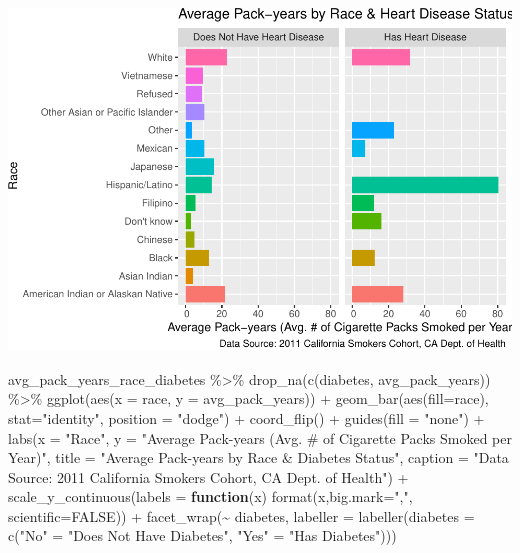 \documentclass[
]{article}
\newenvironment{Shaded}{\begin{snugshade}}{\end{snugshade}}
\newcommand{\AttributeTok}[1]{\textcolor[rgb]{0.77,0.63,0.00}{#1}}
\newcommand{\ConstantTok}[1]{\textcolor[rgb]{0.00,0.00,0.00}{#1}}
\newcommand{\ControlFlowTok}[1]{\textcolor[rgb]{0.13,0.29,0.53}{\textbf{#1}}}
\newcommand{\FunctionTok}[1]{\textcolor[rgb]{0.00,0.00,0.00}{#1}}
\newcommand{\NormalTok}[1]{#1}
\newcommand{\OtherTok}[1]{\textcolor[rgb]{0.56,0.35,0.01}{#1}}
\newcommand{\SpecialCharTok}[1]{\textcolor[rgb]{0.00,0.00,0.00}{#1}}
\newcommand{\StringTok}[1]{\textcolor[rgb]{0.31,0.60,0.02}{#1}}
\begin{document}
\includegraphics{Milestone_4_files/figure-latex/bar graph of cigarette pack-years by race and heartdis-1.pdf}
\newpage

\begin{Shaded}
\begin{Highlighting}[]
\NormalTok{avg\_pack\_years\_race\_diabetes }\SpecialCharTok{\%\textgreater{}\%}
  \FunctionTok{drop\_na}\NormalTok{(}\FunctionTok{c}\NormalTok{(diabetes, avg\_pack\_years)) }\SpecialCharTok{\%\textgreater{}\%}
  \FunctionTok{ggplot}\NormalTok{(}\FunctionTok{aes}\NormalTok{(}\AttributeTok{x =}\NormalTok{ race, }\AttributeTok{y =}\NormalTok{ avg\_pack\_years)) }\SpecialCharTok{+}
  \FunctionTok{geom\_bar}\NormalTok{(}\FunctionTok{aes}\NormalTok{(}\AttributeTok{fill=}\NormalTok{race), }\AttributeTok{stat=}\StringTok{"identity"}\NormalTok{, }\AttributeTok{position =} \StringTok{"dodge"}\NormalTok{) }\SpecialCharTok{+}
  \FunctionTok{coord\_flip}\NormalTok{() }\SpecialCharTok{+}
  \FunctionTok{guides}\NormalTok{(}\AttributeTok{fill =} \StringTok{"none"}\NormalTok{) }\SpecialCharTok{+}
  \FunctionTok{labs}\NormalTok{(}\AttributeTok{x =} \StringTok{"Race"}\NormalTok{,}
       \AttributeTok{y =} \StringTok{"Average Pack{-}years (Avg. \# of Cigarette Packs Smoked per Year)"}\NormalTok{,}
  \AttributeTok{title =} \StringTok{"Average Pack{-}years by Race \& Diabetes Status"}\NormalTok{,}
  \AttributeTok{caption =} \StringTok{"Data Source: 2011 California Smokers Cohort, CA Dept. of Health"}\NormalTok{) }\SpecialCharTok{+}
  \FunctionTok{scale\_y\_continuous}\NormalTok{(}\AttributeTok{labels =} \ControlFlowTok{function}\NormalTok{(x) }\FunctionTok{format}\NormalTok{(x,}\AttributeTok{big.mark=}\StringTok{","}\NormalTok{,}
                                                     \AttributeTok{scientific=}\ConstantTok{FALSE}\NormalTok{)) }\SpecialCharTok{+}
  \FunctionTok{facet\_wrap}\NormalTok{(}\SpecialCharTok{\textasciitilde{}}\NormalTok{ diabetes,}
             \AttributeTok{labeller =} \FunctionTok{labeller}\NormalTok{(}\AttributeTok{diabetes =} \FunctionTok{c}\NormalTok{(}\StringTok{"No"} \OtherTok{=} \StringTok{"Does Not Have Diabetes"}\NormalTok{,}
                                                      \StringTok{"Yes"} \OtherTok{=} \StringTok{"Has Diabetes"}\NormalTok{)))}
\end{Highlighting}
\end{Shaded}
\end{document}
